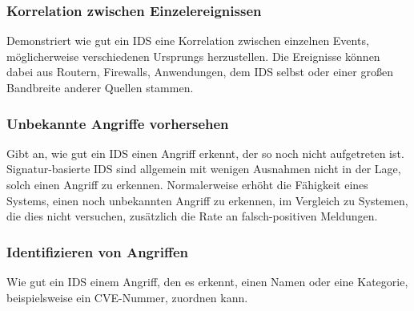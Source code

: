\subsubsection{Korrelation zwischen Einzelereignissen }
Demonstriert wie gut ein IDS eine Korrelation zwischen einzelnen Events, möglicherweise verschiedenen Ursprungs herzustellen. Die Ereignisse können dabei aus Routern, Firewalls, Anwendungen, dem IDS selbst oder einer großen Bandbreite anderer Quellen stammen.
\subsubsection{Unbekannte Angriffe vorhersehen}
Gibt an, wie gut ein IDS einen Angriff erkennt, der so noch nicht aufgetreten ist. Signatur-basierte IDS sind allgemein mit wenigen Ausnahmen nicht in der Lage, solch einen Angriff zu erkennen. Normalerweise erhöht die Fähigkeit eines Systems, einen noch unbekannten Angriff zu erkennen, im Vergleich zu Systemen, die dies nicht versuchen, zusätzlich die Rate an falsch-positiven Meldungen.
\subsubsection{Identifizieren von Angriffen}
Wie gut ein IDS einem Angriff, den es erkennt, einen Namen oder eine Kategorie, beispielsweise ein CVE-Nummer, zuordnen kann.
